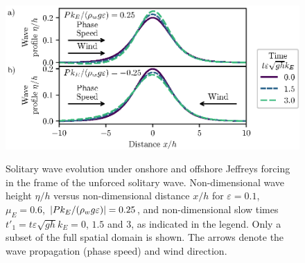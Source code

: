 \documentclass{jfm}
\renewcommand*{\epsilon}{\varepsilon}
\begin{document}
\begin{figure}
  \centering
  { %
    \label{fig:snapshots_solitary:a}
    \label{fig:snapshots_solitary:b}
  }
  \includegraphics{Snapshots-Positive-Negative-Production.eps}
  \caption{
    Solitary wave evolution under
    onshore and
    offshore Jeffreys forcing in the frame of the unforced solitary
    wave.
    Non-dimensional wave height $\eta/h$ versus
    non-dimensional distance $x/h$ for $\epsilon=0.1$,
    $\mu_E = 0.6$, $\abs{P k_E/(\rho_w g \epsilon)} = 0.25$, and
    non-dimensional slow times $t'_1 = t \epsilon \sqrt{gh} k_E = 0$,
    $1.5$ and $3$, as indicated in the legend.
    Only a subset of the full spatial domain is shown.
    The arrows denote the wave propagation (phase speed) and wind
    direction.
  }\label{fig:snapshots_solitary}
\end{figure}
\end{document}
